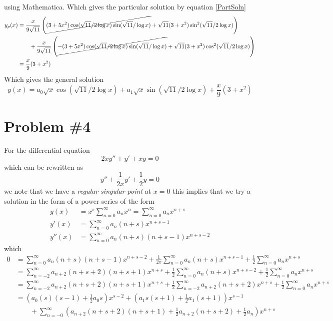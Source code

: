 \documentclass[11pt]{article}
\numberwithin{equation}{section}
\begin{document}
using Mathematica. Which gives the particular solution by equation \ref{PartSoln}
\begin{align*}
y_p(x) &= \frac{x}{9\sqrt{11}}\left(\cancel{(3+5x^2)\cos(\sqrt{11}/2\log x)\sin(\sqrt{11}/\log x)} + \sqrt{11}(3+x^2)\sin^2(\sqrt{11}/2\log x)\right)\\
&\qquad + \frac{x}{9\sqrt{11}}\left(\cancel{-(3+5x^2)\cos(\sqrt{11}/2\log x)\sin(\sqrt{11}/\log x)} + \sqrt{11}(3+x^2)\cos^2(\sqrt{11}/2\log x)\right)\\
&=  \frac{x}{9}(3+x^2)
\end{align*}
Which gives the general solution
$$y(x) = a_0\sqrt{x}\cos(\sqrt{11}/2\log x) + a_1\sqrt{x}\sin(\sqrt{11}/2\log x) +  \frac{x}{9}(3+x^2)$$

\pagebreak

\section{Problem \#4}
For the differential equation
\begin{equation}
2xy'' + y' + xy = 0
\label{Prob4}
\end{equation}
which can be rewritten as
$$y'' + \frac{1}{2x}y' + \frac{1}{2}y = 0$$
we note that we have a \emph{regular singular point} at $x=0$ this implies that we try a 
solution in the form of a power series of the form 
\begin{align*}
y(x) &= x^{s}\sum_{n=0}^{\infty}a_nx^{n} = \sum_{n=0}^{\infty}a_nx^{n+s}\\
y'(x) &= \sum_{n=0}^{\infty}a_n(n+s)x^{n+s-1}\\
y''(x) &= \sum_{n=0}^{\infty}a_n(n+s)(n+s-1)x^{n+s-2}
\end{align*}
which
\begin{align*}
0 &= \sum_{n=0}^{\infty}a_n(n+s)(n+s-1)x^{n+s-2} + \frac{1}{2x}\sum_{n=0}^{\infty}a_n(n+s)x^{n+s-1} + \frac{1}{2}\sum_{n=0}^{\infty}a_nx^{n+s}\\
&= \sum_{n=-2}^{\infty}a_{n+2}(n+s+2)(n+s+1)x^{n+s} + \frac{1}{2}\sum_{n=0}^{\infty}a_n(n+s)x^{n+s-2} + \frac{1}{2}\sum_{n=0}^{\infty}a_nx^{n+s}\\
&= \sum_{n=-2}^{\infty}a_{n+2}(n+s+2)(n+s+1)x^{n+s} + \frac{1}{2}\sum_{n=-2}^{\infty}a_{n+2}(n+s+2)x^{n+s} + \frac{1}{2}\sum_{n=0}^{\infty}a_nx^{n+s}\\
&=\left(a_0(s)(s-1)+\frac{1}{2}a_0s\right)x^{s-2} + \left(a_1s(s+1)+\frac{1}{2}a_1(s+1)\right)x^{s-1}\\
&\qquad  + \sum_{n=-0}^{\infty}\left(a_{n+2}(n+s+2)(n+s+1)+ \frac{1}{2}a_{n+2}(n+s+2) + \frac{1}{2}a_n\right)x^{n+s}
\end{align*}
\end{document}
